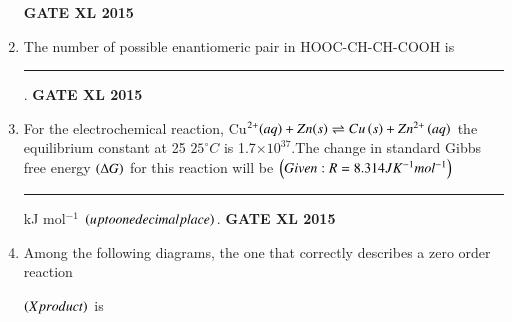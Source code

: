\documentclass[journal,12pt,onecolumn]{IEEEtran}
\begin{document}
\begin{enumerate}
\begin{enumerate}
    \end{enumerate}
\hfill{\textbf{GATE XL 2015}}
\item The number of possible enantiomeric pair in HOOC-CH-CH-COOH is \rule{1cm}{0.15mm}.
\hfill{\textbf{GATE XL 2015}}
\item For the electrochemical reaction, Cu$^{2+}\textit{\ensuremath{\left(aq\right)}}+Zn\textit{\ensuremath{\left(s\right)}} \rightleftharpoons Cu\left(s\right) +Zn^{2+} \left(aq\right)$ the equilibrium constant at 25 $25^{\circ} C$ is 1.7$\times 10 ^{37}$.The change in standard Gibbs free energy $\left(\Delta G\right)$ for this reaction will be $\left(Given: R = 8.314JK ^ {- 1} mol ^{- 1} \right)$\rule{1cm}{0.15mm} kJ mol$^{-1}$ $\left(up to one decimal place\right)$.
\hfill{\textbf{GATE XL 2015}}
\item Among the following diagrams, the one that correctly describes a zero order reaction

$\left(X product\right)$ is


\end{enumerate}
\end{document}
